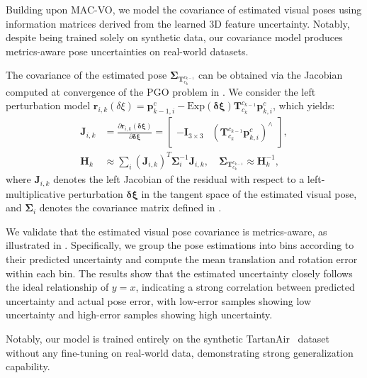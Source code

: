 Building upon MAC-VO, we model the covariance of estimated visual poses using information matrices derived from the learned 3D feature uncertainty.
Notably, despite being trained solely on synthetic data, our covariance model produces metrics-aware pose uncertainties on real-world datasets.

The covariance of the estimated pose $\bm{\Sigma}_{\mathbf{T}^{c_{k-1}}_{c_k}}$ can be obtained via the Jacobian computed at convergence of the PGO problem in . We consider the left perturbation model $\mathbf{r}_{i,k}(\delta\xi)=\mathbf{p}_{k-1, i}^{c} - \text{Exp}(\bm{\delta\xi})\mathbf{T}^{c_{k-1}}_{c_k} \mathbf{p}^{c}_{k, i}$, which yields:
\begin{equation}
\begin{aligned}
    \mathbf{J}_{i,k} &= \frac{\partial{\mathbf{r}_{i,k}(\bm{\delta\xi})}}{\partial \bm{\delta\xi}} = \begin{bmatrix} -\mathbf{I}_{3\times3} & (\mathbf{T}^{c_{k-1}}_{c_k}\mathbf{p}^c_{k,i})^{\wedge} \end{bmatrix}, \\
    \mathbf{H}_{k} &\approx \sum_i (\mathbf{J}_{i,k})^T \bm{\Sigma}_i^{-1} \mathbf{J}_{i,k}, \quad 
     \bm{\Sigma}_{\mathbf{T}^{c_{k-1}}_{c_k}} \approx \mathbf{H}_{k}^{-1},
\end{aligned}
\label{eq:maci2:pose_cov}
\end{equation}
where $\mathbf{J}_{i,k}$ denotes the left Jacobian of the residual with respect to a left-multiplicative perturbation $\bm{\delta \xi}$ in the tangent space of the estimated visual pose, and $\bm{\Sigma}_i$ denotes the covariance matrix defined in .

We validate that the estimated visual pose covariance is metrics-aware, as illustrated in . 
Specifically, we group the pose estimations into bins according to their predicted uncertainty and compute the mean translation and rotation error within each bin. 
The results show that the estimated uncertainty closely follows the ideal relationship of $y = x$, indicating a strong correlation between predicted uncertainty and actual pose error, with low-error samples showing low uncertainty and high-error samples showing high uncertainty.

Notably, our model is trained entirely on the synthetic TartanAir~\cite{tartanair2020iros} dataset without any fine-tuning on real-world data, demonstrating strong generalization capability.

